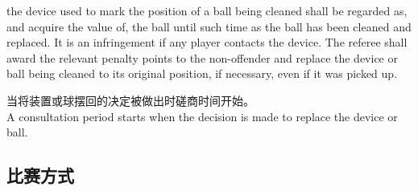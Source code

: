 \begin{enumerate}[label=(\alph*)]
\begin{enumerate}[label=(\roman*)]
        the device used to mark the position of a ball being cleaned shall be regarded as, and acquire the value of, the ball until such time as the ball has been cleaned and replaced. It is an infringement if any player contacts the device. The referee shall award the relevant penalty points to the non-offender and replace the device or ball being cleaned to its original position, if necessary, even if it was picked up.

        当将装置或球摆回的决定被做出时磋商时间开始。\\
        A consultation period starts when the decision is made to replace the device or ball.
    \end{enumerate}
\end{enumerate}

\subsection{比赛方式}\label{2233}

